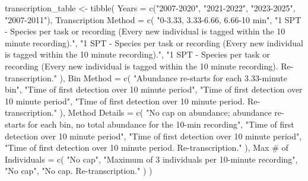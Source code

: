 \documentclass[
  letterpaper,
  DIV=11,
  numbers=noendperiod]{scrartcl}
\newenvironment{Shaded}{\begin{snugshade}}{\end{snugshade}}
\newcommand{\AttributeTok}[1]{\textcolor[rgb]{0.40,0.45,0.13}{#1}}
\newcommand{\FunctionTok}[1]{\textcolor[rgb]{0.28,0.35,0.67}{#1}}
\newcommand{\NormalTok}[1]{\textcolor[rgb]{0.00,0.23,0.31}{#1}}
\newcommand{\OtherTok}[1]{\textcolor[rgb]{0.00,0.23,0.31}{#1}}
\newcommand{\StringTok}[1]{\textcolor[rgb]{0.13,0.47,0.30}{#1}}
\begin{document}
\begin{Shaded}
\begin{Highlighting}[]
\NormalTok{transcription\_table }\OtherTok{\textless{}{-}} \FunctionTok{tibble}\NormalTok{(}
  \AttributeTok{Years =} \FunctionTok{c}\NormalTok{(}\StringTok{"2007{-}2020"}\NormalTok{, }\StringTok{"2021{-}2022"}\NormalTok{, }\StringTok{"2023{-}2025"}\NormalTok{, }\StringTok{"2007{-}2011"}\NormalTok{),}
  \StringTok{\textasciigrave{}}\AttributeTok{Transcription Method}\StringTok{\textasciigrave{}} \OtherTok{=} \FunctionTok{c}\NormalTok{(}
    \StringTok{"0{-}3.33, 3.33{-}6.66, 6.66{-}10 min"}\NormalTok{,}
    \StringTok{"1 SPT {-} Species per task or recording (Every new individual is tagged within the 10 minute recording)."}\NormalTok{,}
    \StringTok{"1 SPT {-} Species per task or recording (Every new individual is tagged within the 10 minute recording)."}\NormalTok{,}
    \StringTok{"1 SPT {-} Species per task or recording (Every new individual is tagged within the 10 minute recording). Re{-}transcription."}
\NormalTok{  ),}
  \StringTok{\textasciigrave{}}\AttributeTok{Bin Method}\StringTok{\textasciigrave{}} \OtherTok{=} \FunctionTok{c}\NormalTok{(}
    \StringTok{"Abundance re{-}starts for each 3.33{-}minute bin"}\NormalTok{,}
    \StringTok{"Time of first detection over 10 minute period"}\NormalTok{,}
    \StringTok{"Time of first detection over 10 minute period"}\NormalTok{,}
    \StringTok{"Time of first detection over 10 minute period. Re{-}transcription."}
\NormalTok{  ),}
  \StringTok{\textasciigrave{}}\AttributeTok{Method Details}\StringTok{\textasciigrave{}} \OtherTok{=} \FunctionTok{c}\NormalTok{(}
    \StringTok{"No cap on abundance; abundance re{-}starts for each bin, no total abundance for the 10{-}min recording"}\NormalTok{,}
    \StringTok{"Time of first detection over 10 minute period"}\NormalTok{,}
    \StringTok{"Time of first detection over 10 minute period"}\NormalTok{,}
    \StringTok{"Time of first detection over 10 minute period. Re{-}transcription."}
\NormalTok{  ),}
  \StringTok{\textasciigrave{}}\AttributeTok{Max \# of Individuals}\StringTok{\textasciigrave{}} \OtherTok{=} \FunctionTok{c}\NormalTok{(}
    \StringTok{"No cap"}\NormalTok{,}
    \StringTok{"Maximum of 3 individuals per 10{-}minute recording"}\NormalTok{,}
    \StringTok{"No cap"}\NormalTok{,}
    \StringTok{"No cap. Re{-}transcription."}
\NormalTok{  )}
\NormalTok{)}


\end{Highlighting}
\end{Shaded}
\end{document}
